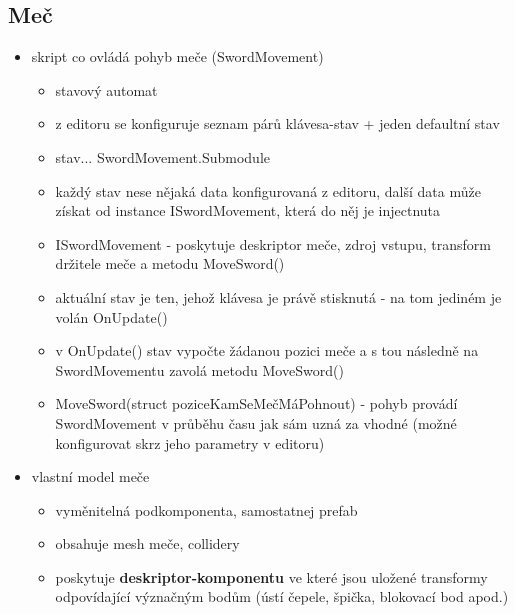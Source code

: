 \subsection{Meč} 
\begin{itemize}
    \item skript co ovládá pohyb meče (SwordMovement)
        \begin{itemize}
            \item stavový automat
            \item z editoru se konfiguruje seznam párů klávesa-stav + jeden defaultní stav
            \item stav... SwordMovement.Submodule
            \item každý stav nese nějaká data konfigurovaná z editoru, další data může získat od instance ISwordMovement, která do něj je injectnuta
            \item ISwordMovement - poskytuje deskriptor meče, zdroj vstupu, transform držitele meče a metodu MoveSword()
            \item aktuální stav je ten, jehož klávesa je právě stisknutá - na tom jediném je volán OnUpdate()
            \item v OnUpdate() stav vypočte žádanou pozici meče a s tou následně na SwordMovementu zavolá metodu MoveSword()
            \item MoveSword(struct poziceKamSeMečMáPohnout) - pohyb provádí SwordMovement v průběhu času jak sám uzná za vhodné (možné konfigurovat skrz jeho parametry v editoru)
        \end{itemize}
    \item vlastní model meče
        \begin{itemize}
            \item vyměnitelná podkomponenta, samostatnej prefab
            \item obsahuje mesh meče, collidery
            \item poskytuje \textbf{deskriptor-komponentu} ve které jsou uložené transformy odpovídající význačným bodům (ústí čepele, špička, blokovací bod apod.)
        \end{itemize}
\end{itemize} 


